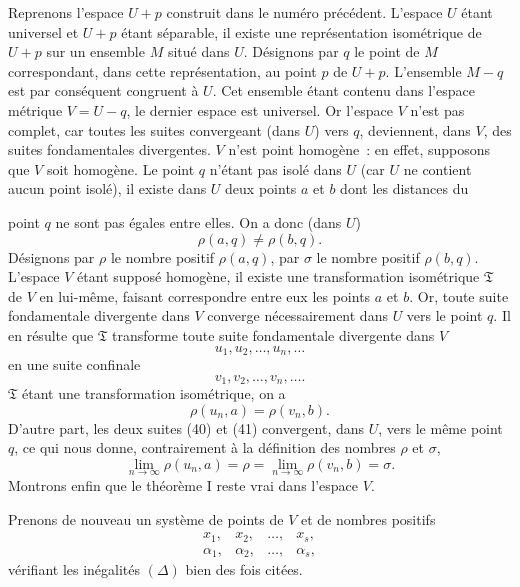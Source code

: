 \documentclass[a4paper,12pt]{amsart}
\newcommand{\srcpage}[1]{} %
\begin{document}
Reprenons l'espace $U+p$ construit dans le numéro précédent. L'espace $U$ étant universel et $U+p$ étant séparable, il existe une représentation isométrique de $U+p$ sur un ensemble $M$ situé dans $U$. Désignons par $q$ le point de $M$ correspondant, dans cette représentation, au point $p$ de $U+p$. L'ensemble $M-q$ est par conséquent congruent à $U$. Cet ensemble étant contenu dans l'espace métrique $V=U-q$, le dernier espace est universel. Or l'espace $V$ n'est pas complet, car toutes les suites convergeant (dans $U$) vers $q$, deviennent, dans $V$, des suites fondamentales divergentes. $V$ n'est point homogène~: en effet, supposons que $V$ soit homogène. Le point $q$ n'étant pas isolé dans $U$ (car $U$ ne contient aucun point isolé), il existe dans $U$ deux points $a$ et $b$ dont les distances du
\srcpage{80}
point $q$ ne sont pas égales entre elles. On a donc (dans $U$)
\[
\rho(a,q)\ne\rho(b,q).
\]
Désignons par $\rho$ le nombre positif $\rho(a,q)$, par $\sigma$ le nombre positif $\rho(b,q)$. L'espace $V$ étant supposé homogène, il existe une transformation isométrique $\mathfrak{T}$ de $V$ en lui-même, faisant correspondre entre eux les points $a$ et $b$. Or, toute suite fondamentale divergente dans $V$ converge nécessairement dans $U$ vers le point $q$. Il en résulte que $\mathfrak{T}$ transforme toute suite fondamentale divergente dans $V$
\begin{equation}\tag{40}
u_1,u_2,\dots,u_n,\dots
\end{equation}
en une suite confinale
\begin{equation}\tag{41}
v_1,v_2,\dots,v_n,\dots.
\end{equation}
$\mathfrak{T}$ étant une transformation isométrique, on a
\begin{equation}\tag{41}
\rho(u_n,a)=\rho(v_n,b).
\end{equation}
D'autre part, les deux suites (40) et (41) convergent, dans $U$, vers le même point $q$, ce qui nous donne, contrairement à la définition des nombres $\rho$ et $\sigma$,
\begin{equation}\tag{42}
\lim_{n\to\infty}\rho(u_n,a)=\rho=\lim_{n\to\infty}\rho(v_n,b)=\sigma.
\end{equation}
Montrons enfin que le théorème I reste vrai dans l'espace $V$.

Prenons de nouveau un système de points de $V$ et de nombres positifs
\[
\begin{array}{cccc}
x_1,&x_2,&\dots,&x_s,\\
\alpha_1,&\alpha_2,&\dots,&\alpha_s,
\end{array}
\]
vérifiant les inégalités $(\Delta)$ bien des fois citées.
\end{document}
